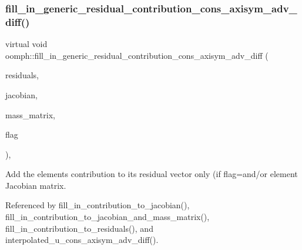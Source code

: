 \subsubsection{\texorpdfstring{fill\+\_\+in\+\_\+generic\+\_\+residual\+\_\+contribution\+\_\+cons\+\_\+axisym\+\_\+adv\+\_\+diff()}{fill\_in\_generic\_residual\_contribution\_cons\_axisym\_adv\_diff()}}
{\footnotesize\ttfamily virtual void oomph\+::fill\+\_\+in\+\_\+generic\+\_\+residual\+\_\+contribution\+\_\+cons\+\_\+axisym\+\_\+adv\+\_\+diff (\begin{DoxyParamCaption}\item[{\hyperlink{classoomph_1_1Vector}{Vector}$<$ double $>$ \&}]{residuals,  }\item[{\hyperlink{classoomph_1_1DenseMatrix}{Dense\+Matrix}$<$ double $>$ \&}]{jacobian,  }\item[{\hyperlink{classoomph_1_1DenseMatrix}{Dense\+Matrix}$<$ double $>$ \&}]{mass\+\_\+matrix,  }\item[{unsigned}]{flag }\end{DoxyParamCaption})\hspace{0.3cm}{\ttfamily [protected]}, {\ttfamily [virtual]}}



Add the element\textquotesingle{}s contribution to its residual vector only (if flag=and/or element Jacobian matrix. 



Referenced by fill\+\_\+in\+\_\+contribution\+\_\+to\+\_\+jacobian(), fill\+\_\+in\+\_\+contribution\+\_\+to\+\_\+jacobian\+\_\+and\+\_\+mass\+\_\+matrix(), fill\+\_\+in\+\_\+contribution\+\_\+to\+\_\+residuals(), and interpolated\+\_\+u\+\_\+cons\+\_\+axisym\+\_\+adv\+\_\+diff().

\mbox{\label{namespaceoomph_a82958379ca7e57f9f8c3f273eb83f55c}} 

